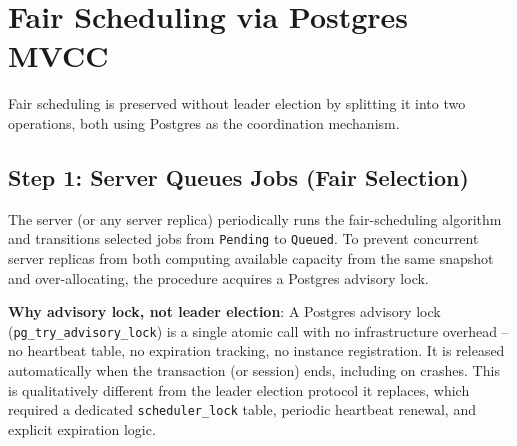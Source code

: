 \documentclass[11pt]{article}
\begin{document}
\section{Fair Scheduling via Postgres MVCC}
\label{sec:fair-scheduling}

Fair scheduling is preserved without leader election by splitting it into two
operations, both using Postgres as the coordination mechanism.

\subsection{Step 1: Server Queues Jobs (Fair Selection)}

The server (or any server replica) periodically runs the fair-scheduling algorithm and
transitions selected jobs from \texttt{Pending} to \texttt{Queued}. To prevent
concurrent server replicas from both computing available capacity from the same
snapshot and over-allocating, the procedure acquires a Postgres advisory lock.

\textbf{Why advisory lock, not leader election}: A Postgres advisory lock
(\texttt{pg\_try\_advisory\_lock}) is a single atomic call with no infrastructure
overhead -- no heartbeat table, no expiration tracking, no instance registration. It
is released automatically when the transaction (or session) ends, including on
crashes. This is qualitatively different from the leader election protocol it
replaces, which required a dedicated \texttt{scheduler\_lock} table, periodic
heartbeat renewal, and explicit expiration logic.
\end{document}
